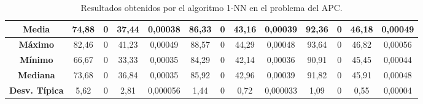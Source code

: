 \documentclass[11pt,a4paper]{article}
\begin{document}
\begin{table}[H]
{\begin{tabular}{c|c|c|c|c|c|c|c|c|c|c|c|c|}
\multicolumn{1}{|c|}{\textbf{Media}}        & 74,88                      & 0                       & 37,44                  & 0,00038    & 86,33                      & 0                       & 43,16                  & 0,00039    & 92,36                      & 0                       & 46,18                  & 0,00049    \\ \hline
\multicolumn{1}{|c|}{\textbf{Máximo}}       & 82,46                      & 0                       & 41,23                  & 0,00049    & 88,57                      & 0                       & 44,29                  & 0,00048    & 93,64                      & 0                       & 46,82                  & 0,00056    \\ \hline
\multicolumn{1}{|c|}{\textbf{Mínimo}}       & 66,67                      & 0                       & 33,33                  & 0,00035    & 84,29                      & 0                       & 42,14                  & 0,00036    & 90,91                      & 0                       & 45,45                  & 0,00044    \\ \hline
\multicolumn{1}{|c|}{\textbf{Mediana}}      & 73,68                      & 0                       & 36,84                  & 0,00035    & 85,92                      & 0                       & 42,96                  & 0,00039    & 91,82                      & 0                       & 45,91                  & 0,00048    \\ \hline
\multicolumn{1}{|c|}{\textbf{Desv. Típica}} & 5,62                       & 0                       & 2,81                   & 0,000056   & 1,44                       & 0                       & 0,72                   & 0,000033   & 1,09                       & 0                       & 0,55                   & 0,00004    \\ \hline
\end{tabular}
}%
\caption{Resultados obtenidos por el algoritmo 1-NN en el problema del APC.}
\end{table}
\end{document}
